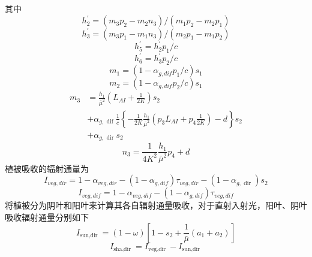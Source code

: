 其中
\begin{equation}
h_{2}^{\prime}=\left(m_{3} p_{2}-m_{2} n_{3}\right) /\left(m_{1} p_{2}-m_{2} p_{1}\right)
\end{equation}
\begin{equation}
h_{3}^{\prime}=\left(m_{3} p_{1}-m_{1} n_{3}\right) /\left(m_{2} p_{1}-m_{1} p_{2}\right)
\end{equation}
\begin{equation}
h_{5}^{\prime}=h_{2}^{\prime} p_{1} / c
\end{equation}
\begin{equation}
h_{6}^{\prime}=h_{3}^{\prime} p_{2} / c
\end{equation}
\begin{equation}
m_{1}=\left(1-\alpha_{g, dif} p_{1} / c\right) s_{1}
\end{equation}
\begin{equation}
m_{2}=\left(1-\alpha_{g, dif } p_{2} / c\right) s_{1}
\end{equation}
\begin{equation}
\begin{aligned} m_{3} &=\frac{h_{1}}{\bar{\mu}^{2}}\left(L_{A I}+\frac{1}{2 K}\right) s_{2} \\ &+\alpha_{g, \text { dif }}
 \frac{1}{c}\left\{-\frac{1}{2 K} \frac{h_{1}}{\bar{\mu}^{2}}\left(p_{3} L_{A I}+p_{4} \frac{1}{2 K}\right)-d\right\} s_{2} \\ 
 &+\alpha_{g, \text { dir }} s_{2} \end{aligned}
\end{equation}
\begin{equation}
n_{3}=\frac{1}{4 K^{2}} \frac{h_{1}}{\bar{\mu}^{2}} p_{4}+d
\end{equation}
植被吸收的辐射通量为
\begin{equation}
I_{veg, dir}=1-\alpha_{veg, dir}-\left(1-\alpha_{g, dif}\right) \tau_{veg, dir}-\left(1-\alpha_{g, \text { dir }}\right) s_{2}
\end{equation}
\begin{equation}
I_{veg, dif}=1-\alpha_{veg, dif}-\left(1-\alpha_{g,dif}\right) \tau_{veg, dif}
\end{equation}
\citet{dai2004two} 将植被分为阴叶和阳叶来计算其各自辐射通量吸收，对于直射入射光，阳叶、阴叶吸收辐射通量分别如下
\begin{equation}
I_{\text {sun,dir }}=(1-\omega)\left[1-s_{2}+\frac{1}{\bar{\mu}}\left(a_{1}+a_{2}\right)\right]
\end{equation}
\begin{equation}
I_{\text {sha,dir }}=I_{\text {veg,dir }}-I_{\text {sun,dir }}
\end{equation}
